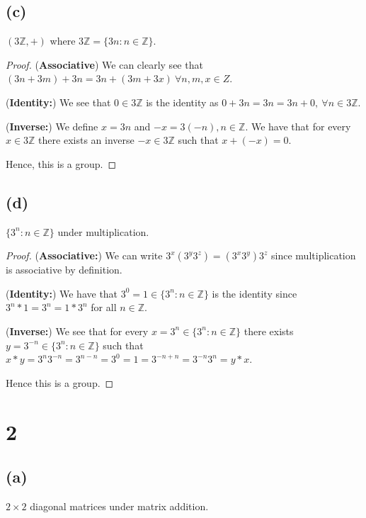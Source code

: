 \documentclass{article}
\newcommand{\Z}{\mathbb{Z}}
\begin{document}
\subsection*{(c)}
$(3\Z, +)$ where $3\Z = \{3n: n\in\Z\}$.
\begin{proof}
    (\textbf{Associative}) We can clearly see that $(3n + 3m) + 3n = 3n + (3m + 3x) \ \forall n,m,x \in Z$.

    (\textbf{Identity:}) We see that $0 \in 3\Z$ is the identity as $0 + 3n = 3n = 3n + 0, \ \forall n \in 3\Z$.

    (\textbf{Inverse:}) We define $x = 3n$ and $-x = 3(-n), n \in \Z$.
    We have that for every $x \in 3\Z$ there exists an inverse $-x \in 3\Z$
    such that $x + (-x) = 0$.

    Hence, this is a group.
\end{proof}

\subsection*{(d)}
$\{3^n: n \in \Z\}$ under multiplication.
\begin{proof}
    (\textbf{Associative:})
    We can write $3^x(3^y3^z) = (3^x3^y)3^z$ since multiplication is associative by definition.

    (\textbf{Identity:})
    We have that $3^0 = 1 \in \{3^n: n \in \Z\}$ is the identity since $3^n * 1 = 3^n = 1*3^n$
    for all $n \in \Z$.

    (\textbf{Inverse:})
    We see that for every $x = 3^n \in \{3^n: n \in \Z\}$ there exists $y = 3^{-n} \in \{3^n: n \in \Z\}$
    such that $x*y = 3^n3^{-n} = 3^{n-n} = 3^0 = 1 = 3^{-n+n} = 3^{-n}3^n = y*x$.

    Hence this is a group.
\end{proof}

\section*{2}
\subsection*{(a)}
$2\times 2$ diagonal matrices under matrix addition.
\end{document}

